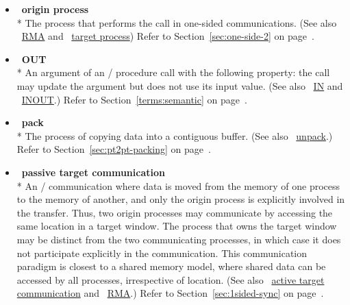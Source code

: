 \begin{itemize}
\label{glossary:origin_process}
\item  ~\hypertarget{glossary:origin_process}{\textbf{origin process}} \\*
The process that performs the call in one-sided communications.
(See also ~\hyperlink{glossary:RMA}{RMA} and ~\hyperlink{glossary:target_process}{target process})
Refer to Section~\ref{sec:one-side-2} on page~\pageref{sec:one-side-2}.

\label{glossary:OUT}
\item  ~\hypertarget{glossary:OUT}{\textbf{OUT}} \\*
An argument of an \MPI/ procedure call with the following property: the call may update the argument but does not use its input value.
(See also ~\hyperlink{glossary:IN}{IN} and ~\hyperlink{glossary:INOUT}{INOUT}.)
Refer to Section~\ref{terms:semantic} on page~\pageref{terms:semantic}.

\label{glossary:pack}
\item  ~\hypertarget{glossary:pack}{\textbf{pack}} \\*
The process of copying data into a contiguous buffer.
(See also ~\hyperlink{glossary:unpack}{unpack}.)
Refer to Section~\ref{sec:pt2pt-packing} on page~\pageref{sec:pt2pt-packing}.

\label{glossary:passive_target_communication}
\item  ~\hypertarget{glossary:passive_target_communication}{\textbf{passive target communication}} \\*
An \RMA/ communication where data is moved from the memory of one
process to the memory of another, and only the origin process is
explicitly involved
in
the transfer.  Thus, two origin processes may communicate by accessing
the same location in a target window.  The process that owns the
target window may be distinct from the two communicating processes, 
in which case it does not participate explicitly in the communication.
This communication
paradigm is closest to a shared memory model, where shared data can be
accessed by all processes, irrespective 
of location. (See also ~\hyperlink{glossary:active_target_communication}{active target communication} and
~\hyperlink{glossary:RMA}{RMA}.)
Refer to Section~\ref{sec:1sided-sync} on page~\pageref{sec:1sided-sync}.


\end{itemize}
